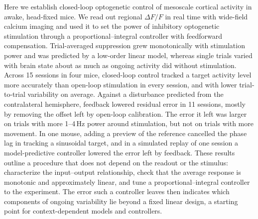 Here we establish closed-loop optogenetic control of mesoscale cortical activity in awake, head-fixed mice. We read out
regional $\Delta F/F$ in real time with wide-field calcium imaging and used it to set the power of inhibitory
optogenetic stimulation through a proportional--integral controller with feedforward compensation. Trial-averaged
suppression grew monotonically with stimulation power and was predicted by a low-order linear model, whereas single
trials varied with brain state about as much as ongoing activity did without stimulation. Across 15 sessions in four
mice, closed-loop control tracked a target activity level more accurately than open-loop stimulation in every session,
and with lower trial-to-trial variability on average. Against a disturbance predicted from the contralateral
hemisphere, feedback lowered residual error in 11 sessions, mostly by removing the offset left by open-loop
calibration. The error it left was larger on trials with more 1--4\,Hz power around stimulation, but not on trials with
more movement. In one mouse, adding a preview of the reference cancelled the phase lag in tracking a sinusoidal target,
and in a simulated replay of one session a model-predictive controller lowered the error left by feedback. These results
outline a procedure that does not depend on the readout or the stimulus: characterize the input--output relationship,
check that the average response is monotonic and approximately linear, and tune a proportional--integral controller to
the experiment. The error such a controller leaves then indicates which components of ongoing variability lie beyond a
fixed linear design, a starting point for context-dependent models and controllers.
